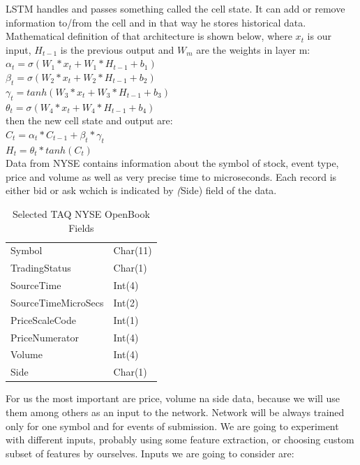 \documentclass[twoside]{article}
\begin{document}
\begin{multicols}{2}
LSTM handles and passes something called the cell state. It can add or remove information to/from the cell and in that way he stores
historical data. Mathematical definition of that architecture is shown below, where $x_{t}$ is our input, $H_{t-1}$ is the previous output and 
$W_{m}$ are the weights in layer m: \\
\newline
$ \alpha_{t} = \sigma(W_{1} * x_{t} + W_{1} * H_{t-1} + b_{1}) $ \\
$ \beta_{t} = \sigma(W_{2} * x_{t} + W_{2} * H_{t-1} + b_{2}) $ \\
$ \gamma_{t} = tanh(W_{3} * x_{t} + W_{3} * H_{t-1} + b_{3}) $ \\
$ \theta_{t} = \sigma(W_{4} * x_{t} + W_{4} * H_{t-1} + b_{4}) $ \\
\newline
then the new cell state and output are:  \\
\newline
$ C_{t} = \alpha_{t} * C_{t-1} + \beta_{t} * \gamma_{t} $ \\
$ H_{t} = \theta_{t} * tanh(C_{t}) $ \\


Data from NYSE contains information about the symbol of stock, event type, price and volume as well as very precise time to microseconds.
Each record is either bid or ask wchich is indicated by \emph(Side) field of the data.  

\begin{table}[H]
\caption{Selected TAQ NYSE OpenBook Fields}
\centering
\begin{tabular}{ll}
Symbol & Char(11) \\
TradingStatus & Char(1) \\
SourceTime & Int(4) \\
SourceTimeMicroSecs & Int(2) \\
PriceScaleCode & Int(1) \\
PriceNumerator & Int(4) \\
Volume & Int(4) \\ 
Side & Char(1) \\
\end{tabular}
\end{table}

For us the most important are price, volume na side data, because we will use them 
among others as an input to the network. Network will be always trained only for one symbol 
and for events of submission. We are going to experiment with different inputs,
probably using some feature extraction, or choosing custom subset of features by ourselves.
Inputs we are going to consider are:


\end{multicols}
\end{document}
